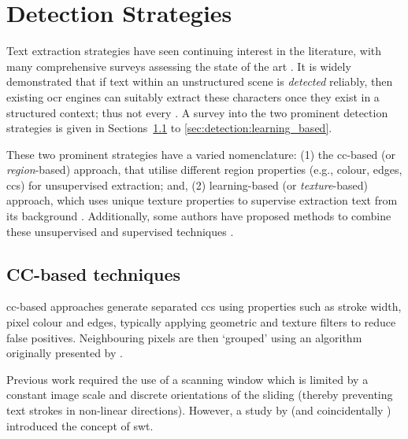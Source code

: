 \section{Detection Strategies}
\label{sec:detection_strategies}

Text extraction strategies have seen continuing interest in the literature, with many comprehensive surveys assessing the state of the art \cite{Chen:2000ua, Jung:2004uwa, Zhang:2008vfa, Liang:2005uy, Jung:2004uw}. It is widely demonstrated that if text within an unstructured scene is \textit{detected} reliably, then existing \gls{ocr} engines can suitably extract these characters \citep{Smith:2007dc} once they exist in a structured context; thus not every . A survey into the two prominent detection strategies is given in Sections~\ref{sec:detection:cc_based} to \ref{sec:detection:learning_based}.

These two prominent strategies have a varied nomenclature: (1) the \gls{cc}-based (or \textit{region}-based) approach, that utilise different region properties (e.g., colour, edges, \glspl{cc}) \citep{Jain:1998wd, Kim:1996tw, Liu:2006wh, Chen:2011ul, Li:2012wd, Zhang:2011cl, Shivakumara:2011dn, Epshtein:2010tj, Zhang:2010wa, Shivakumara:2010wu, Liu:2008tz, Subramanian:2007tf, Lee:2010vv, Sun:2010tg} for unsupervised extraction; and, (2) learning-based (or \textit{texture}-based) approach, which uses unique texture properties to supervise extraction text from its background \citep{Wang:2009vp, Hanif:2009tm, Tu:2003tg, Ye:2005wu, Lee:2003cn, XiangrongChen:2004ha, Chen:2005wv}. Additionally, some authors have proposed methods to combine these unsupervised and supervised techniques \citep{Mutch:2006ub, Mairal:2008uw, Bengio:2006vb}.

\subsection{CC-based techniques}
\label{sec:detection:cc_based}

\gls{cc}-based approaches generate separated \glspl{cc} using properties such as stroke width, pixel colour and edges, typically applying geometric and texture filters to reduce false positives. Neighbouring pixels are then `grouped' using an algorithm originally presented by \citet{Horn:1986vc}. 

Previous work required the use of a scanning window \citep{XiangrongChen:2004ha, Lienhart:2002ub, Jung:2009do} which is limited by a constant image scale and discrete orientations of the sliding (thereby preventing text strokes in non-linear directions). However, a study by \citet{Epshtein:2010tj} (and coincidentally \citet{Zhang:2011cl}) introduced the concept of \gls{swt}.

